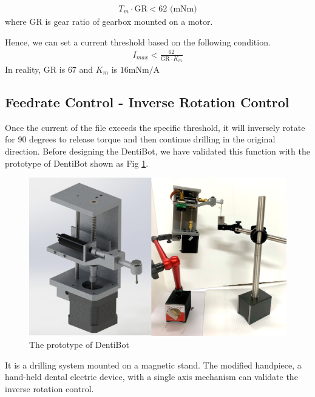 \begin{equation}
\begin{split}
T_m \cdot \mathrm{GR} < 62 \text{ (mNm)}
\end{split}
\end{equation}
where $\mathrm{GR}$ is gear ratio of gearbox mounted on a motor.
\par
Hence, we can set a current threshold based on the following condition. 
\begin{equation}
\begin{split}
I_{max} < \frac{62}{\mathrm{GR} \cdot K_m}
\end{split}
\end{equation} 
In reality, $\mathrm{GR}$ is $67$ and $K_m$ is $16 \text{mNm/A}$
\subsection{Feedrate Control - Inverse Rotation Control}
\label{sec:Inver Rotation Control}
\hspace*{6mm}Once the current of the file exceeds the specific threshold, it will inversely rotate for 90 degrees to release torque and then continue drilling in the original direction. Before designing the DentiBot, we have validated this function with the prototype of DentiBot shown as Fig \ref{fig: prototype}.
\begin{figure}[htbp]
\begin{center}
\includegraphics[width=1\linewidth]{Images/Prototype.png}
\caption{The prototype of DentiBot
}\label{fig: prototype}
\end{center}
\end{figure}	
\par
It is a drilling system mounted on a magnetic stand. The modified handpiece, a hand-held dental electric device, with a single axis mechanism can validate the inverse rotation control. 
